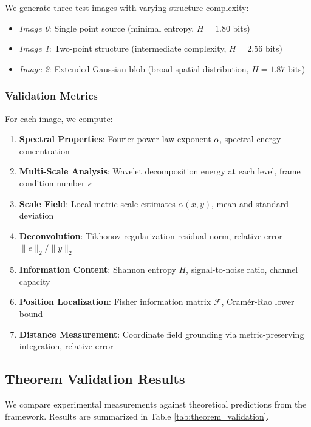 \documentclass[twocolumn,11pt]{article}
\begin{document}
We generate three test images with varying structure complexity:
\begin{itemize}
\item \textit{Image 0}: Single point source (minimal entropy, $H = 1.80$ bits)
\item \textit{Image 1}: Two-point structure (intermediate complexity, $H = 2.56$ bits)
\item \textit{Image 2}: Extended Gaussian blob (broad spatial distribution, $H = 1.87$ bits)
\end{itemize}

\subsubsection{Validation Metrics}

For each image, we compute:
\begin{enumerate}
\item \textbf{Spectral Properties}: Fourier power law exponent $\alpha$, spectral energy concentration
\item \textbf{Multi-Scale Analysis}: Wavelet decomposition energy at each level, frame condition number $\kappa$
\item \textbf{Scale Field}: Local metric scale estimates $\alpha(x,y)$, mean and standard deviation
\item \textbf{Deconvolution}: Tikhonov regularization residual norm, relative error $\|e\|_2 / \|y\|_2$
\item \textbf{Information Content}: Shannon entropy $H$, signal-to-noise ratio, channel capacity
\item \textbf{Position Localization}: Fisher information matrix $\mathcal{F}$, Cramér-Rao lower bound
\item \textbf{Distance Measurement}: Coordinate field grounding via metric-preserving integration, relative error
\end{enumerate}

\subsection{Theorem Validation Results}

We compare experimental measurements against theoretical predictions from the framework. Results are summarized in Table \ref{tab:theorem_validation}.
\end{document}
